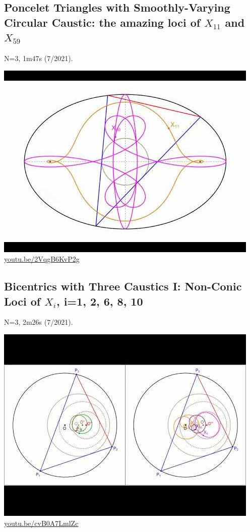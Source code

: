 \documentclass[12pt]{amsart}
\begin{document}
\subsection{Poncelet Triangles with Smoothly-Varying Circular Caustic: the amazing loci of $X_{11}$ and $X_{59}$}
\label{vid:2VqgB6KvP2g}
\noindent N=3, 1m47s (7/2021). 
\begin{center}\includegraphics[width=.5\textwidth]{pics/2VqgB6KvP2g.jpg} \\ 
\href{https://youtu.be/2VqgB6KvP2g}{\url{youtu.be/2VqgB6KvP2g}}\end{center}
% 

\subsection{Bicentrics with Three Caustics I: Non-Conic Loci of $X_i$, i=1, 2, 6, 8, 10}
\label{vid:cvB0A7LmlZc}
\noindent N=3, 2m26s (7/2021). 
\begin{center}\includegraphics[width=.5\textwidth]{pics/cvB0A7LmlZc.jpg} \\ 
\href{https://youtu.be/cvB0A7LmlZc}{\url{youtu.be/cvB0A7LmlZc}}\end{center}
% 
\end{document}
